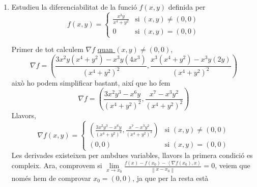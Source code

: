 \documentclass[a4paper, 12pt]{article}
\begin{document}
    \begin{exercici}
        \begin{enumerate}[label=\alph*)]
            \item Estudieu la diferenciabilitat de la funció $f(x,y)$ definida per
            \begin{displaymath}
                f(x,y) = \begin{cases}
                    \frac{x^3y}{x^4+y^2} & \text{si } \left(x,y\right) \neq \left(0,0\right)\\
                    0 & \text{si } \left(x,y\right) = \left(0,0\right)
                \end{cases}
            \end{displaymath}
            \begin{solucio}
                Primer de tot calculem $\nabla f$ \underline{quan $(x,y) \neq (0,0)$},
                \begin{displaymath}
                    \nabla f = \left(\frac{3x^2y\left(x^4+y^2\right)-x^3y\left(4x^3\right)}{\left(x^4+y^2\right)^2}, \frac{x^3\left(x^4+y^2\right)-x^3y\left(2y\right)}{\left(x^4+y^2\right)^2}\right)
                \end{displaymath}
                això ho podem simplificar bastant, així que ho fem
                \begin{displaymath}
                    \nabla f = \left(\frac{3x^2y^3-x^6y}{\left(x^4+y^2\right)^2}, \frac{x^7-x^3y^2}{\left(x^4+y^2\right)^2}\right)
                \end{displaymath}
                Llavors, \begin{displaymath}
                    \nabla f(x,y) = \begin{cases}
                        \left(\frac{3x^2y^3-x^6y}{\left(x^4+y^2\right)^2}, \frac{x^7-x^3y^2}{\left(x^4+y^2\right)^2}\right) & \text{si } \left(x,y\right) \neq \left(0,0\right)\\
                        \left(0,0\right) & \text{si } \left(x,y\right) = \left(0,0\right)
                    \end{cases}
                \end{displaymath}
                Les derivades existeixen per ambdues variables, llavors la primera condició es
                compleix. Ara, comprovem si $\lim\limits_{x\to x_0}\frac{f(x)-f(x_0)-\left\langle \nabla f(x_0), x\right\rangle}{\left\lVert x-x_0\right\rVert} = 0$,
                veiem que només hem de comprovar $x_0 = \left(0,0\right)$, ja que per la resta està

\end{solucio}
\end{enumerate}
\end{exercici}
\end{document}

